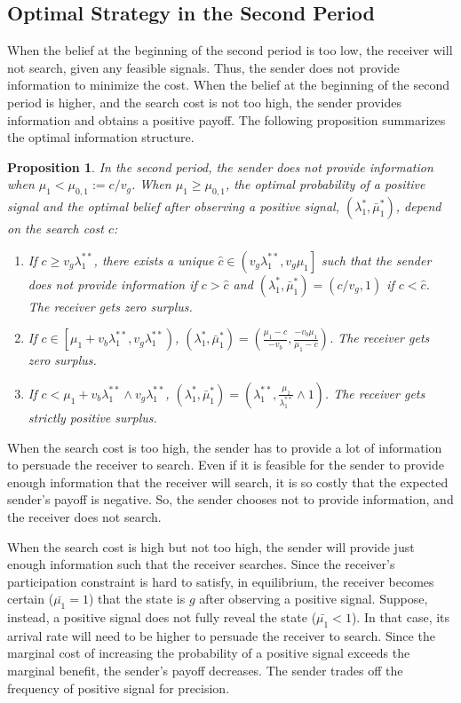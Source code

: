 \documentclass[11pt]{extarticle}
\newtheorem{proposition}{Proposition}
\newcommand{\m}{\wedge}
\begin{document}
\subsection{Optimal Strategy in the Second Period}
When the belief at the beginning of the second period is too low, the receiver will not search, given any feasible signals. Thus, the sender does not provide information to minimize the cost. When the belief at the beginning of the second period is higher, and the search cost is not too high, the sender provides information and obtains a positive payoff. The following proposition summarizes the optimal information structure.
\begin{proposition}\label{strategy1p}
	In the second period, the sender does not provide information when $\mu_1 < \mu_{0,1}:=c/v_g$. When $\mu_1 \geq \mu_{0,1}$, the optimal probability of a positive signal and the optimal belief after observing a positive signal, $(\lambda^*_1,\bar{\mu}_1^*)$, depend on the search cost $c$:
	\begin{enumerate}
		\item If $c \geq v_g \lambda_1^{**}$, there exists a unique $\widehat{c} \in \left(v_g\lambda_1^{**},v_g \mu_1 \right]$ such that the sender does not provide information if $c > \widehat{c}$ and $(\lambda^*_1,\bar{\mu}_1^*) = (c/v_g,1)$ if $c < \widehat{c}$. The receiver gets zero surplus.
		
		\item If $c \in \left[\mu_1+v_b\lambda_1^{**},v_g\lambda_1^{**} \right)$, $(\lambda^*_1,\bar{\mu}_1^*) = (\frac{\mu_1-c}{-v_b},\frac{-v_b \mu_1}{\mu_1-c})$. The receiver gets zero surplus.
		
		\item If $c < \mu_1+v_b\lambda_1^{**} \m v_g \lambda_1^{**}$, $(\lambda^*_1,\bar{\mu}_1^*) =  (\lambda_1^{**},\frac{\mu_1}{\lambda_1^{**}}\m 1)$. The receiver gets strictly positive surplus.
	\end{enumerate}
	
\end{proposition}

When the search cost is too high, the sender has to provide a lot of information to persuade the receiver to search. Even if it is feasible for the sender to provide enough information that the receiver will search, it is so costly that the expected sender's payoff is negative. So, the sender chooses not to provide information, and the receiver does not search. 

When the search cost is high but not too high, the sender will provide just enough information such that the receiver searches. Since the receiver's participation constraint is hard to satisfy, in equilibrium, the receiver becomes certain ($\bar{\mu_1} = 1$) that the state is $g$ after observing a positive signal. Suppose, instead, a positive signal does not fully reveal the state ($\bar{\mu_1} < 1$). In that case, its arrival rate will need to be higher to persuade the receiver to search. Since the marginal cost of increasing the probability of a positive signal exceeds the marginal benefit, the sender's payoff decreases. The sender trades off the frequency of positive signal for precision.
\end{document}
